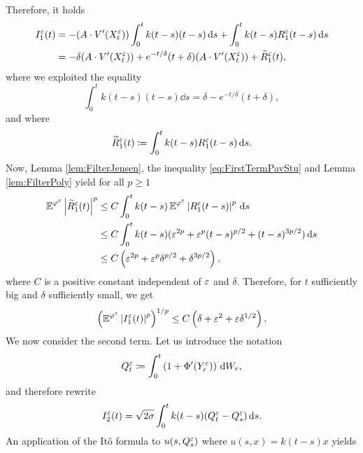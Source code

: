 \documentclass[10pt]{article}
\begin{document}
\begin{appendices}
\begin{equation}
	\end{equation}
	Therefore, it holds 
	\begin{equation}\label{eq:Diff_I1}
	\begin{aligned}
	I_1^\varepsilon(t) &= -(A \cdot V'(X_t^\varepsilon)) \int_0^t k(t-s) (t-s)\,\mathrm{d} s + \int_0^t k(t-s)R_1^\varepsilon(t-s) \,\mathrm{d} s\\
	&= -\delta (A \cdot  V'(X_t^\varepsilon)) + e^{-t/\delta}(t + \delta)(A \cdot V'(X_t^\varepsilon)) + \widetilde R_1^\varepsilon(t),
	\end{aligned}
	\end{equation}
	where we exploited the equality
	\begin{equation}
	\int_0^t k(t-s) (t-s) \dd s = \delta - e^{-t/\delta}(t + \delta),
	\end{equation}
	and where
	\begin{equation}
	\widetilde R_1^\varepsilon(t) \coloneqq \int_0^t k(t-s)R_1^\varepsilon(t-s) \,\mathrm{d} s.
	\end{equation}
	Now, Lemma \ref{lem:FilterJensen}, the inequality \eqref{eq:FirstTermPavStu} and Lemma \ref{lem:FilterPoly} yield for all $p \geq 1$
	\begin{equation}
	\begin{aligned}
		\operatorname{\mathbb{E}}^{\varphi^\varepsilon}\left\lvert\widetilde R_1^\varepsilon(t)\right\rvert^p &\leq C \int_0^t k(t-s)\operatorname{\mathbb{E}}^{\varphi^\varepsilon} \left\lvert R_1^\varepsilon(t-s)\right\rvert^p \,\mathrm{d} s\\
		&\leq C \int_0^t k(t-s)(\varepsilon^{2p} + \varepsilon^p(t-s)^{p/2}+(t-s)^{3p/2}) \,\mathrm{d} s\\
		&\leq C \left( \varepsilon^{2p} + \varepsilon^p \delta^{p/2} + \delta^{3p/2} \right),
	\end{aligned}
	\end{equation}
	where $C$ is a positive constant independent of $\varepsilon$ and $\delta$. Therefore, for $t$ sufficiently big and $\delta$ sufficiently small, we get
	\begin{equation}
		\left(\operatorname{\mathbb{E}}^{\varphi^\varepsilon}\left\lvert I_1^\varepsilon(t)\right\rvert^{p}\right)^{1/p} \leq C \left( \delta + \varepsilon^2 + \varepsilon \delta^{1/2} \right).
	\end{equation}
	We now consider the second term. Let us introduce the notation  
	\begin{equation}
		Q_t^\varepsilon \coloneqq \int_0^t \left(1 + \Phi'(Y_r^\varepsilon)\right) \,\mathrm{d} W_r,
	\end{equation}
	and therefore rewrite
	\begin{equation}
		I_2^\varepsilon(t) = \sqrt{2\sigma} \int_0^t k(t-s)(Q_t^\varepsilon - Q_s^\varepsilon) \,\mathrm{d} s.
	\end{equation}
	An application of the Itô formula to $u(s, Q_s^\varepsilon)$ where $u(s, x) = k(t-s)x$ yields

\end{appendices}
\end{document}
